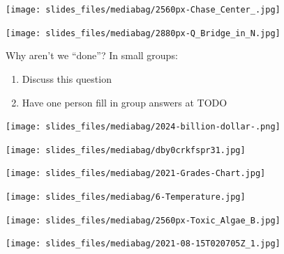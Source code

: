 \documentclass[
  ignorenonframetext,
]{beamer}
\providecommand{\tightlist}{%
  \setlength{\itemsep}{0pt}\setlength{\parskip}{0pt}}\usepackage{longtable,booktabs,array}
\begin{document}
\begin{frame}{}
\label{section-2}
\texttt{[image: slides\_files/mediabag/2560px-Chase\_Center\_.jpg]}
\end{frame}

\begin{frame}{}
\label{section-3}
\texttt{[image: slides\_files/mediabag/2880px-Q\_Bridge\_in\_N.jpg]}
\end{frame}

\begin{frame}{Why aren't we ``done''?}
\label{why-arent-we-done}
In small groups:

\begin{enumerate}
\tightlist
\item
  Discuss this question
\item
  Have one person fill in group answers at TODO
\end{enumerate}
\end{frame}

\begin{frame}
\texttt{[image: slides\_files/mediabag/2024-billion-dollar-.png]}
\end{frame}

\begin{frame}
\texttt{[image: slides\_files/mediabag/dby0crkfspr31.jpg]}
\end{frame}

\begin{frame}
\texttt{[image: slides\_files/mediabag/2021-Grades-Chart.jpg]}
\end{frame}

\begin{frame}
\texttt{[image: slides\_files/mediabag/6-Temperature.jpg]}
\end{frame}

\begin{frame}
\texttt{[image: slides\_files/mediabag/2560px-Toxic\_Algae\_B.jpg]}
\end{frame}

\begin{frame}
\texttt{[image: slides\_files/mediabag/2021-08-15T020705Z\_1.jpg]}
\end{frame}
\end{document}
